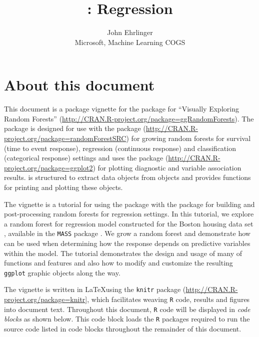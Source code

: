 \documentclass[article]{jss}
\author{
John Ehrlinger\\Microsoft, Machine Learning COGS
}
\title{\pkg{ggRandomForests}: Regression \pkg{randomForestSRC}}
\begin{document}
\section{About this document}\label{about-this-document}

This document is a package vignette for the 
package for ``Visually Exploring Random Forests''
(\url{http://CRAN.R-project.org/package=ggRandomForests}). The
 package is designed for use with the
 package
(\url{http://CRAN.R-project.org/package=randomForestSRC})
\citep{Ishwaran:RFSRC:2014} for growing random forests for survival
(time to event response), regression (continuous response) and
classification (categorical response) settings and uses the
 package (\url{http://CRAN.R-project.org/package=ggplot2})
\citep{Wickham:2009} for plotting diagnostic and variable association
results.  is structured to extract data objects
from  objects and provides functions for printing
and plotting these objects.

The vignette is a tutorial for using the  package
with the  package for building and post-processing
random forests for regression settings. In this tutorial, we explore a
random forest for regression model constructed for the Boston housing
data set \citep[\citet{Belsley:1980}]{Harrison:1978}, available in the
\texttt{MASS} package \citep{mass:2002}. We grow a random forest and
demonstrate how  can be used when determining how
the response depends on predictive variables within the model. The
tutorial demonstrates the design and usage of many of
 functions and features and also how to modify and
customize the resulting \texttt{ggplot} graphic objects along the way.

The vignette is written in \LaTeX using the \texttt{knitr} package
(\url{http://CRAN.R-project.org/package=knitr}{]}\citep[\citet{Xie:2014},\citet{Xie:2013}]{Xie:2015},
which facilitates weaving \texttt{R} \citep{rcore} code, results and
figures into document text. Throughout this document, \texttt{R} code
will be displayed in \emph{code blocks} as shown below. This code block
loads the \texttt{R} packages required to run the source code listed in
code blocks throughout the remainder of this document.
\end{document}
